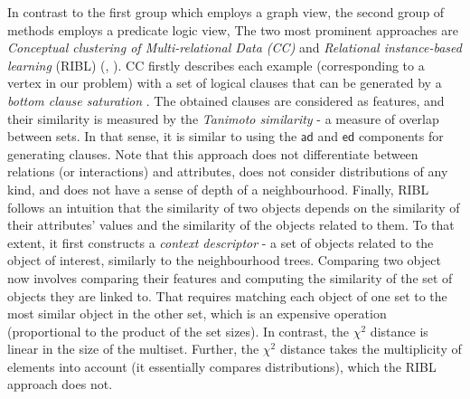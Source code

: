 In contrast to the first group which employs a graph view, the second group of methods employs a predicate logic view, 
The two most prominent approaches are \textit{Conceptual clustering of Multi-relational Data (CC)} \cite{Fonseca2012} and \textit{Relational instance-based learning} (RIBL) (\cite{RIBL96}, \cite{Kirsten98relationaldistance-based}).
CC firstly describes each example (corresponding to a vertex in our problem) with a set of logical clauses that can be generated by a \textit{bottom clause saturation} \cite{CamachoFRC07}. 
The obtained clauses are considered as features, and their similarity is measured by  the \textit{Tanimoto similarity} - a measure of overlap between sets.
In that sense, it is similar to using the $\mathsf{ad}$ and $\mathsf{ed}$ components for generating clauses.
Note that this approach does not differentiate between relations (or interactions) and attributes, does not consider distributions of any kind, and does not have a sense of depth of a neighbourhood.
Finally, RIBL follows an intuition that the similarity  of two objects depends on the similarity of their attributes' values and the similarity of the objects related to them.
To that extent, it first constructs a \textit{context descriptor} - a set of objects related to the object of interest, similarly to the neighbourhood trees.
Comparing two object now involves comparing their features and computing the similarity of the set of objects they are linked to.
That requires matching each object of one set to the most similar object in the other set, which is an expensive operation (proportional to the product of the set sizes). 
In contrast, the $\chi^2$ distance is linear in the size of the multiset. 
Further, the $\chi^2$ distance takes the multiplicity of elements into account (it essentially compares distributions), which the RIBL approach does not.



